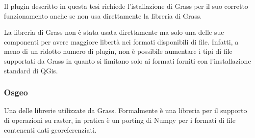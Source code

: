 Il plugin descritto in questa tesi richiede l'istallazione di Grass per il suo corretto funzionamento anche se non usa direttamente la libreria di Grass. 

La libreria di Grass non è stata usata direttamente ma solo una delle sue componenti per avere maggiore libertà nei formati disponibili di file. Infatti, a meno di un ridotto numero di plugin, non è possibile aumentare i tipi di file supportati da Grass in quanto si limitano solo ai formati forniti con l'installazione standard di QGis.

\subsubsection{Osgeo}
Una delle librerie utilizzate da Grass. Formalmente è una libreria per il supporto di operazioni su raster, in pratica è un porting di Numpy per i formati di file contenenti dati georeferenziati.

